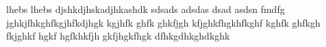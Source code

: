 lhebs lhebs djshkdjhskadjhkashdk sdsads adsdas dsad asdsn fmdfg jghkjfhkghfkgjhfkdjhgk kgjhfk ghfk ghkfjgh kfjghkfhgkhfkghf kghfk ghfkgh fkjghkf hgkf hgfkhkfjh gkfjhgkfhgk dfhkgdhkghdkghk
